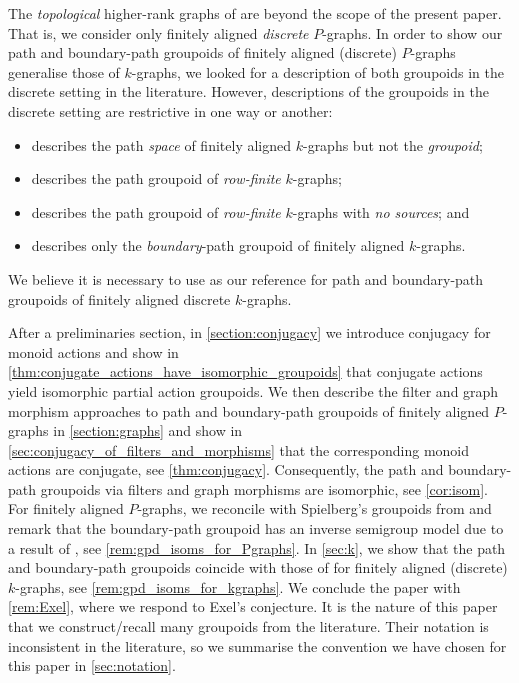 \documentclass[11pt]{amsart}
\theoremstyle{definition}
\numberwithin{thm}{section}
\numberwithin{equation}{section}
\newcommand{\emphasis}[1]{\textit{#1}}
\begin{document}
The \emphasis{topological} higher-rank graphs of \cite{Yee07, RW17, RSWY18} are beyond the scope of the present paper. 
That is, we consider only finitely aligned \emphasis{discrete} $P$-graphs. 
In order to show our path and boundary-path groupoids of finitely aligned (discrete) $P$-graphs generalise those of $k$-graphs, we looked for a description of both groupoids in the discrete setting in the literature. 
However, descriptions of the groupoids in the discrete setting are restrictive in one way or another:
\begin{itemize}
\item \cite[\S 3]{Web11} describes the path \emphasis{space} of finitely aligned $k$-graphs but not the \emphasis{groupoid};
\item \cite[Appendix B.1]{aHKR15} describes the path groupoid of \emphasis{row-finite} $k$-graphs;
\item \cite[Example 5.4]{CP17_Cohn} describes the path groupoid of \emphasis{row-finite} $k$-graphs with \emphasis{no sources}; and
\item \cite[Example 5.2]{CP17_KP} describes only the \emphasis{boundary}-path groupoid of finitely aligned $k$-graphs.
\end{itemize}
We believe it is necessary to use \cite{Yee07} as our reference for path and boundary-path groupoids of finitely aligned discrete $k$-graphs.

After a preliminaries section, in \cref{section:conjugacy} we introduce conjugacy for monoid actions and show in \cref{thm:conjugate_actions_have_isomorphic_groupoids} that conjugate actions yield isomorphic partial action groupoids. 
We then describe the filter and graph morphism approaches to path and boundary-path groupoids of finitely aligned $P$-graphs in \cref{section:graphs} and show in \cref{sec:conjugacy_of_filters_and_morphisms} that the corresponding monoid actions are conjugate, see \cref{thm:conjugacy}. 
Consequently, the path and boundary-path groupoids via filters and graph morphisms are isomorphic, see \cref{cor:isom}. 
For finitely aligned $P$-graphs, we reconcile with Spielberg's groupoids from \cite{Spi20} and remark that the boundary-path groupoid has an inverse semigroup model due to a result of \cite{OP20}, see \cref{rem:gpd_isoms_for_Pgraphs}. 
In \cref{sec:k}, we show that the path and boundary-path groupoids coincide with those of \cite{FMY05, Yee07} for finitely aligned (discrete) $k$-graphs, see \cref{rem:gpd_isoms_for_kgraphs}. 
We conclude the paper with \cref{rem:Exel}, where we respond to Exel's conjecture. 
It is the nature of this paper that we construct/recall many groupoids from the literature. 
Their notation is inconsistent in the literature, so we summarise the convention we have chosen for this paper in \cref{sec:notation}.
\end{document}
